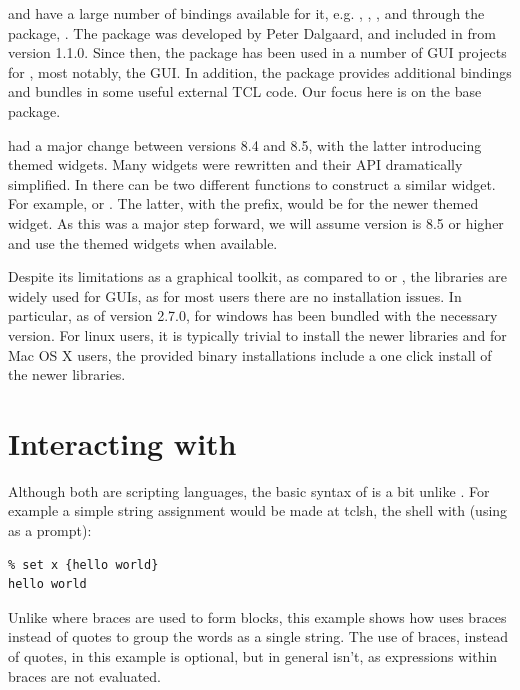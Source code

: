 \TCL\/ and \TK\/ have a large number of bindings available for it, e.g. , ,
, and through the  package, \R. The  package
was developed by Peter Dalgaard, and  included in \R\/ from version
1.1.0. Since then, the package has been used in a number of GUI 
projects for \R,  most notably, the  GUI. In addition, the
 package provides additional bindings and bundles in some
useful external TCL code. Our focus here is on the base package.

\TK\/ had a major change between versions 8.4 and 8.5, with the latter
introducing themed widgets. Many widgets were rewritten and their API
dramatically simplified. In  there can be two different
functions to construct a similar widget. For example,
 or . The latter, with the
 prefix, would be for the newer themed widget. As this was a
major step forward, we will assume \TK\/ version is 8.5 or higher and
use the themed widgets when available.

Despite its limitations as a graphical toolkit, as compared to \GTK\/
or \Qt, the \TK\/ libraries are widely used for \R\/ GUIs, as for most
users there are no installation issues. In particular, as of version
2.7.0, \R\/ for windows has been bundled with the necessary \TK\/
version. For linux users, it is typically trivial to install the newer
libraries and for Mac OS X users, the provided binary installations
include a one click install of the newer \TK\/ libraries.



\section{Interacting with \TCL}
\label{sec:tcltk:interacting-with-tcl}


Although both are scripting languages, the basic syntax of \TCL\/ is a bit unlike \R. For
example a simple string assignment would be made at tclsh, the \TCL\/
shell with (using \code{\%} as a prompt):
\begin{verbatim}
% set x {hello world}
hello world
\end{verbatim}
Unlike \R\/ where braces are used to form blocks, this example shows
how \TCL\/ uses braces instead of quotes to group the words as a
single string. The use of braces, instead of quotes, in this example
is optional, but in general isn't, as expressions within braces are
not evaluated.  

